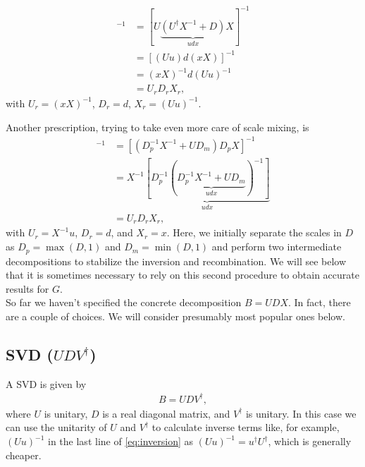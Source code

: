 \documentclass[%
 reprint,
superscriptaddress,
showpacs,
 amsmath,amssymb,
 aps,
 prb,
longbibliography,
]{revtex4-1}
\begin{document}
\begin{align}
[\mathbb{1} + UDX]^{-1} &= [U\underbrace{(U^\dagger X^{-1} + D)}_{udx}X]^{-1} \nonumber\\
&= [(Uu)d(xX)]^{-1} \label{eq:inversion}\\
&= (xX)^{-1} d (Uu)^{-1}\nonumber\\
&= U_r D_r X_r \nonumber,
\end{align}
with $U_r = (xX)^{-1}$, $D_r = d$, $X_r = (Uu)^{-1}$.

Another prescription\cite{Loh2005, Loh1989}, trying to take even more care of scale mixing, is
\begin{align}
	[\mathbb{1} + UDX]^{-1} &= [(D_p^{-1} X^{-1} + U D_m) D_p X]^{-1} \nonumber \\
	&= X^{-1} \underbrace{[D_p^{-1} (\underbrace{D_p^{-1} X^{-1} + UD_m}_{udx})^{-1}]}_{udx} \label{eq:inversion_loh} \\
	&= U_r D_r X_r, \nonumber
\end{align}
with $U_r = X^{-1}u$, $D_r = d$, and $X_r = x$. Here, we initially separate the scales in $D$ as $D_p = \max(D, 1)$ and $D_m = \min(D, 1)$ and perform two intermediate decompositions to stabilize the inversion and recombination. We will see below that it is sometimes necessary to rely on this second procedure to obtain accurate results for $G$.\\

So far we haven't specified the concrete decomposition $B = UDX$. In fact, there are a couple of choices. We will consider presumably most popular ones below.

\subsection{SVD ($UDV^\dagger$)}
A SVD is given by
\begin{align}
	B = UDV^\dagger,
\end{align}
where $U$ is unitary, $D$ is a real diagonal matrix, and $V^\dagger$ is unitary. In this case we can use the unitarity of $U$ and $V^\dagger$ to calculate inverse terms like, for example, $(Uu)^{-1}$ in the last line of \ref{eq:inversion} as $(Uu)^{-1} = u^\dagger U^\dagger$, which is generally cheaper.
\end{document}
